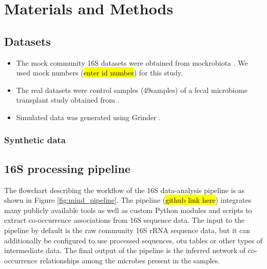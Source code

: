 
\section*{Materials and Methods}

  \subsection*{Datasets}

    \vspace{-5mm}
    \begin{itemize}
      \item The mock community 16S datasets were obtained from mockrobiota \cite{Bokulich2016}. We used mock numbers (\hl{enter id number}) for this study.
      \item The real datasets were control samples (49samples)  of a fecal microbiome transplant study obtained from \cite{Kang2017}.
      \item Simulated data was generated using Grinder \cite{Angly2012}.
    \end{itemize}

    \subsubsection*{Synthetic data}



  \subsection*{16S processing pipeline}

    \vspace{-5mm}

    The flowchart describing the workflow of the 16S data-analysis pipeline is as shown in Figure \ref{fig:mind_pipeline}.
    The pipeline (\hl{github link here}) integrates many publicly available tools as well as custom Python modules and scripts to extract co-occurrence associations from 16S sequence data.
    The input to the pipeline by default is the raw community 16S rRNA sequence data, but it can additionally be configured to use processed sequences, \ac{otu} tables or other types of intermediate data.
    The final output of the pipeline is the inferred network of co-occurrence relationships among the microbes present in the samples.


